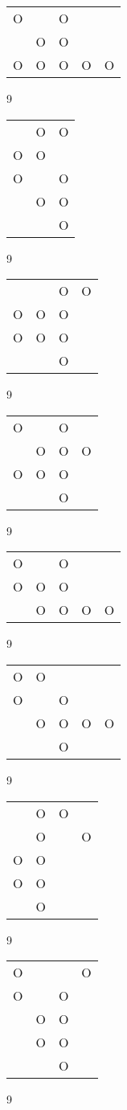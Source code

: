 \begin{tabular}{|m{0.2cm}m{0.2cm}m{0.2cm}m{0.2cm}m{0.2cm}|}\hline
O& &O& & \\
 &O&O& & \\
O&O&O&O&O\\
\hline\end{tabular}9
\begin{tabular}{|m{0.2cm}m{0.2cm}m{0.2cm}|}\hline
 &O&O\\
O&O& \\
O& &O\\
 &O&O\\
 & &O\\
\hline\end{tabular}9
\begin{tabular}{|m{0.2cm}m{0.2cm}m{0.2cm}m{0.2cm}|}\hline
 & &O&O\\
O&O&O& \\
O&O&O& \\
 & &O& \\
\hline\end{tabular}9
\begin{tabular}{|m{0.2cm}m{0.2cm}m{0.2cm}m{0.2cm}|}\hline
O& &O& \\
 &O&O&O\\
O&O&O& \\
 & &O& \\
\hline\end{tabular}9
\begin{tabular}{|m{0.2cm}m{0.2cm}m{0.2cm}m{0.2cm}m{0.2cm}|}\hline
O& &O& & \\
O&O&O& & \\
 &O&O&O&O\\
\hline\end{tabular}9
\begin{tabular}{|m{0.2cm}m{0.2cm}m{0.2cm}m{0.2cm}m{0.2cm}|}\hline
O&O& & & \\
O& &O& & \\
 &O&O&O&O\\
 & &O& & \\
\hline\end{tabular}9
\begin{tabular}{|m{0.2cm}m{0.2cm}m{0.2cm}m{0.2cm}|}\hline
 &O&O& \\
 &O& &O\\
O&O& & \\
O&O& & \\
 &O& & \\
\hline\end{tabular}9
\begin{tabular}{|m{0.2cm}m{0.2cm}m{0.2cm}m{0.2cm}|}\hline
O& & &O\\
O& &O& \\
 &O&O& \\
 &O&O& \\
 & &O& \\
\hline\end{tabular}9
